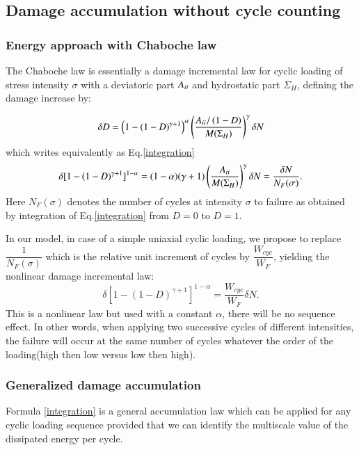 \documentclass[3p,times,procedia,number]{elsarticle}
\begin{document}
\subsection{Damage accumulation without cycle counting}
\subsubsection{Energy approach with Chaboche law}
The Chaboche law\cite{lemaitre1990mechanics} is essentially a damage incremental law for cyclic loading of stress intensity $\sigma$ with a deviatoric part ${A}_{\uppercase\expandafter{\romannumeral2}}$ and hydrostatic part $\Sigma_H$, defining the damage increase by:

\begin{equation}\delta D = \left( 1 -(1-D)^{\gamma+1}\right)^\alpha \left(\frac{{A}_{\uppercase\expandafter{\romannumeral2}}/\left( 1-D\right) }{M(\Sigma_H)}\right)^\gamma \delta N
	\label{chabochemulti}
\end{equation} 
which writes equivalently as Eq.\eqref{integration}
\begin{equation}\delta [1-(1-D)^{\gamma+1}]^{1-\alpha}=(1-\alpha)(\gamma+1)\left(\dfrac{{A}_{\uppercase\expandafter{\romannumeral2}} }{M(\Sigma_H)}\right)^\gamma \delta N=\dfrac{\delta N}{N_F(\sigma)}.
	\label{integration}
\end{equation}
Here $N_F(\sigma)$ denotes the number of cycles at intensity $\sigma$ to failure as obtained by integration of Eq.\eqref{integration} from $D=0$ to $D=1$.

In our model, in case of a simple uniaxial cyclic loading, we propose to replace $\dfrac{1}{N_F(\sigma)}$ which is the relative unit increment of cycles by $\dfrac{W_{cyc}}{W_F}$, yielding the nonlinear damage incremental law:
\begin{equation}
	\delta[1-(1-D)^{\gamma+1}]^{1-\alpha}=\dfrac{W_{cyc}}{W_F}\delta N.
	\label{integrationW}
\end{equation}
This is a nonlinear law but used with a constant $\alpha$, there will be no sequence effect. In other words,
when applying two successive cycles of different intensities, the failure will occur at the same number of cycles whatever the order of the loading(high then low versus low then high).

\subsubsection{Generalized damage accumulation}
Formula \eqref{integration} is a general accumulation law which can be applied for any cyclic loading sequence provided that we can identify the multiscale value of the dissipated energy per cycle. 
\end{document}
